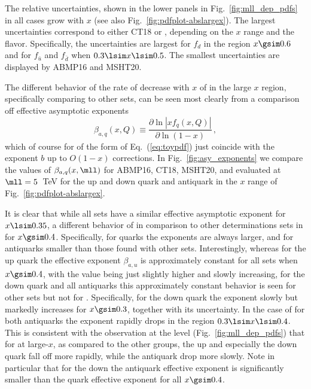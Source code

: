 The relative \pdfs uncertainties, shown in the lower panels in
Fig.~\ref{fig:mll_dep_pdfs} in all cases grow with $x$ (see also 
Fig.~\ref{fig:pdfplot-abslargex}).
%
The largest \pdf uncertainties correspond to either CT18 or , 
depending on the $x$ range and the \pdf flavor.
%
Specifically, the  uncertainties are largest for $f_d$ in the
region $x\gsim 0.6$ 
and for $f_{\bar{u}}$ and $f_{\bar{d}}$ when $0.3 \lsim x \lsim 0.5$.
%
The smallest \pdf uncertainties are displayed by ABMP16 and  MSHT20.

The different behavior of the rate of decrease with $x$ of
\pdfs  in the large $x$ region, specifically comparing 
to other \pdf sets, can  be seen most clearly from a comparison off
effective asymptotic exponents~\cite{Ball:2016spl}
\begin{equation}
  \beta_{a,q}(x,Q)\equiv\frac{\partial \ln|xf_q(x,Q)|}{\partial \ln(1-x)}\,,
  \label{eq:beta_asy}
\end{equation}
which of course for \pdfs of the form of Eq.~(\ref{eq:toypdf}) just
coincide with the exponent $b$ up to $O(1-x)$ corrections.
In Fig.~\ref{fig:asy_exponents} we compare
the values of $\beta_{a,q}(x,\mll)$
for ABMP16, CT18, MSHT20, and  evaluated at $\mll=5$~TeV
for the up and down quark and antiquark \pdfs in the  $x$ range of
Fig.~\ref{fig:pdfplot-abslargex}.

It is clear that while all \pdf
sets have a similar effective asymptotic exponent for $x\lsim 0.35$, a
different behavior of  in comparison to other
determinations sets in for $x\gsim 0.4$.
%
Specifically, for quarks the  exponents are always larger,
and for antiquarks smaller than those found with other \pdf
sets.
%
Interestingly, whereas for the up quark the
effective exponent $\beta_{a,u}$ is approximately constant for all
\pdf sets when  $x\gsim 0.4$, with the  value being just
slightly higher and slowly increasing, for the down quark and all
antiquarks this approximately constant behavior is seen for other
\pdf sets but not for .
%
Specifically, for the  down quark
the exponent slowly but markedly increases for $x\gsim 0.3$, together 
with its uncertainty.
%
In the case of  for both antiquarks the exponent
rapidly drops  in the region $0.3 \lsim x \lsim 0.4$.
%
This is consistent with the observation at the \pdf level
(Fig.~\ref{fig:mll_dep_pdfs})  that for 
at large-$x$, as compared to the other groups,
the up and especially the down  quark fall off more rapidly, while
the antiquark \pdfs drop more slowly. Note in particular that for
the down \pdf the antiquark effective exponent is significantly
smaller than the quark effective exponent for all $x\gsim0.4$.

